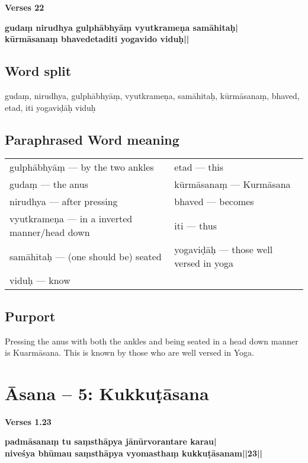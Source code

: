 \noindent 
\textbf{Verses 22}

\begin{shloka}
\textbf{gudaṃ nirudhya gulphābhyāṃ vyutkrameṇa samāhitaḥ|}\\
\textbf{kūrmāsanaṃ bhavedetaditi yogavido viduḥ||}
\end{shloka}

\subsection*{Word split}

gudaṃ, nirudhya, gulphābhyāṃ, vyutkrameṇa, samāhitaḥ, kūrmā\-sanaṃ, bhaved, etad, iti yogaviḍāḥ viduḥ

\subsection*{Paraphrased Word meaning}

\begin{longtable}{>{\noindent\raggedright}p{5cm}>{\noindent\raggedright}p{5cm}}
gulphābhyāṃ --- by the two ankles  & etad --- this\tabularnewline
gudaṃ --- the anus  & kūrmāsanaṃ --- Kurmāsana\tabularnewline
nirudhya --- after pressing & bhaved --- becomes\tabularnewline
vyutkrameṇa --- in a inverted manner/head down & iti --- thus\tabularnewline
samāhitaḥ --- (one should be) seated  & yogaviḍāḥ --- those well versed in yoga\tabularnewline
viduḥ --- know & 
\end{longtable}

\subsection*{Purport}

Pressing the anus with both the ankles and being seated in a head down manner is Kuarmāsana. This is known by those who are well versed in Yoga. 

\newpage


\section*{Āsana -- 5: Kukkuṭāsana}

\noindent 
\textbf{Verses 1.23}

\begin{shloka}
\textbf{padmāsanaṃ tu saṃsthāpya jānūrvorantare karau|}\\
\textbf{niveśya bhūmau saṃsthāpya vyomasthaṃ kukkuṭāsanam||23||}
\end{shloka}

